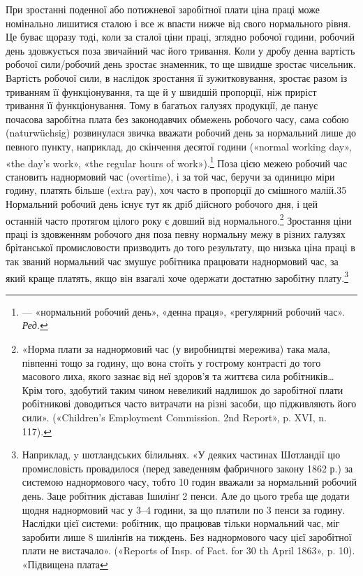 При зростанні поденної або потижневої заробітної плати ціна
праці може номінально лишитися сталою і все ж впасти нижче
від свого нормального рівня. Це буває щоразу тоді, коли за сталої
ціни праці, зглядно робочої години, робочий день здовжується
поза звичайний час його тривання. Коли у дробу
денна вартість робочої сили/робочий день зростає
знаменник, то ще швидше зростає чисельник. Вартість робочої сили, в наслідок зростання її
зужитковування, зростає разом із триванням
її функціонування, та ще й у швидшій пропорції, ніж приріст тривання її
функціонування. Тому в багатьох галузях продукції, де панує
почасова заробітна плата без законодавчих обмежень робочого
часу, сама собою (naturwüchsig) розвинулася звичка вважати
робочий день за нормальний лише до певного пункту, наприклад,
до скінчення десятої години («normal working day», «the day’s
work», «the regular hours of work»).\footnote*{
— «нормальний робочий день», «денна праця», «регулярний робочий
час». \emph{Ред.}
} Поза цією межею робочий
час становить наднормовий час (overtime), і за той час, беручи
за одиницю міри годину, платять більше (extra рау), хоч часто
в пропорції до смішного малій.35 Нормальний робочий день
існує тут як дріб дійсного робочого дня, і цей останній часто протягом
цілого року є довший від нормального.\footnote{
«Норма плати за наднормовий час (у виробництві мережива) така
мала, півпенні тощо за годину, що вона стоїть у гострому контрасті до
того масового лиха, якого зазнає від неї здоров’я та життєва сила робітників\dots{}
Крім того, здобутий таким чином невеликий надлишок до заробітної
плати робітникові доводиться часто витрачати на різні засоби,
що підживляють його сили». («Children’s Employment Commission. 2nd
Report», p. XVI, n. 117).
} Зростання ціни
праці із здовженням робочого дня поза певну нормальну межу
в різних галузях брітанської промисловости призводить до того
результату, що низька ціна праці в так званий нормальний час змушує
робітника працювати наднормовий час, за який краще платять,
якщо він взагалі хоче одержати достатню заробітну плату.\footnote{
Наприклад, y шотландських білильнях. «У деяких частинах
Шотландії цю промисловість провадилося (перед заведенням фабричного
закону 1862 р.) за системою наднормового часу, тобто 10 годин вважали
за нормальний робочий день. Заце робітник діставав Ішилінґ 2 пенси.
Але до цього треба ще додати щодня наднормовий час у 3--4 години,
за що платили по 3 пенси за годину. Наслідки цієї системи: робітник,
що працював тільки нормальний час, міг заробити лише 8 шилінґів на
тиждень. Без наднормового часу цієї заробітної плати не вистачало».
(«Reports of Insp. of Fact. for 30 th April 1863», p. 10). «Підвищена плата
}

